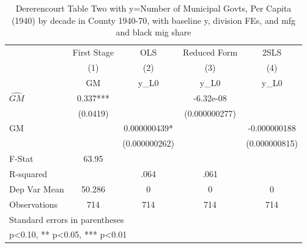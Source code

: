 \begin{table}[htbp]\centering
\def\sym#1{\ifmmode^{#1}\else\(^{#1}\)\fi}
\caption{Dererencourt Table Two with y=Number of Municipal Govts, Per Capita (1940) by decade in County 1940-70, with baseline y, division FEs, and mfg and black mig share}
\begin{tabular}{l*{4}{c}}
\toprule
                    & First Stage   &         OLS   &Reduced Form   &        2SLS   \\
                    &\multicolumn{1}{c}{(1)}&\multicolumn{1}{c}{(2)}&\multicolumn{1}{c}{(3)}&\multicolumn{1}{c}{(4)}\\
                    &\multicolumn{1}{c}{GM}&\multicolumn{1}{c}{y\_L0}&\multicolumn{1}{c}{y\_L0}&\multicolumn{1}{c}{y\_L0}\\
\midrule
$\hat{GM}$          &       0.337***&               &   -6.32e-08   &               \\
                    &    (0.0419)   &               &(0.000000277)   &               \\
\addlinespace
GM                  &               & 0.000000439*  &               &-0.000000188   \\
                    &               &(0.000000262)   &               &(0.000000815)   \\
\midrule
F-Stat              &       63.95   &               &               &               \\
R-squared           &               &        .064   &        .061   &               \\
Dep Var Mean        &      50.286   &           0   &           0   &           0   \\
Observations        &         714   &         714   &         714   &         714   \\
\bottomrule
\multicolumn{5}{l}{\footnotesize Standard errors in parentheses}\\
\multicolumn{5}{l}{\footnotesize * p<0.10, ** p<0.05, *** p<0.01}\\
\end{tabular}
\end{table}
